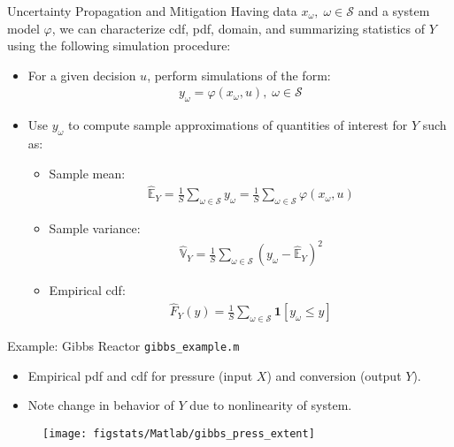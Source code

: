 \documentclass[handout,9pt]{beamer}
\begin{document}
%
\begin{frame}{Uncertainty Propagation and Mitigation}
Having data $x_\omega,\; \omega \in \mathcal{S}$ and a system model $\varphi$, we can characterize cdf, pdf, domain, and summarizing statistics of $Y$ using the following simulation procedure:
\begin{block}{}
\begin{itemize}
\item For a given decision $u$, perform simulations of the form:
\begin{align*}
y_\omega=\varphi(x_\omega,u),\; \omega \in \mathcal{S}
\end{align*} 
\item Use $y_\omega$ to compute sample approximations of quantities of interest for $Y$ such as:

\begin{itemize}
\item Sample mean:
\begin{align*}
 \hat{\mathbb{E}}_Y=\frac{1}{S}\sum_{\omega \in \mathcal{S}}y_\omega=\frac{1}{S}\sum_{\omega \in \mathcal{S}}\varphi(x_\omega,u)
 \end{align*}
\item Sample variance: 
\begin{align*}
\hat{\mathbb{V}}_Y=\frac{1}{S}\sum_{\omega \in \mathcal{S}}(y_\omega-\hat{\mathbb{E}}_Y)^2
\end{align*} 
\item Empirical cdf: 
\begin{align*}
\hat{F}_Y(y)=\frac{1}{S}\sum_{\omega \in \mathcal{S}}\mathbf{1}[y_\omega \leq y] 
\end{align*}
\end{itemize}
\end{itemize}
\end{block}
\end{frame}

\begin{frame}{Example: Gibbs Reactor \footnotesize{\texttt{gibbs\_example.m}}}
\begin{itemize}
\item Empirical pdf and cdf for pressure (input $X$) and conversion (output $Y$). 
\item Note change in behavior of $Y$ due to nonlinearity of system. 
\end{itemize}
\begin{figure}[!htb]
    \centering
	\texttt{[image: figstats/Matlab/gibbs\_press\_extent]}
\end{figure}

\end{frame}
\end{document}
